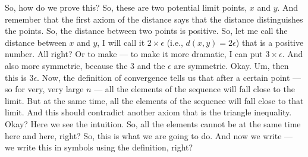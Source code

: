 \begin{spoken-clean}[00:09:12 - 00:11:03]
So, how do we prove this?  So, these are two potential limit points, $x$ and $y$. And remember that the first axiom of the distance says that the distance distinguishes the points. So, the distance between two points is positive. So, let me call the distance between $x$ and $y$, I will call it $2 \times \epsilon$ (i.e., $d(x, y) = 2\epsilon$) that is a positive number. All right? Or to make — to make it more dramatic, I can put $3 \times \epsilon$. And also more symmetric, because the $3$ and the $\epsilon$ are symmetric. Okay. Um, then this is $3\epsilon$. Now, the definition of convergence tells us that after a certain point — so for very, very large $n$ — all the elements of the sequence will fall close to the limit. But at the same time, all the elements of the sequence will fall close to that limit. And this should contradict another axiom that is the triangle inequality. Okay? Here we see the intuition. So, all the elements cannot be at the same time here and here, right? So, this is what we are going to do. And now we write — we write this in symbols using the definition, right?
\end{spoken-clean}

